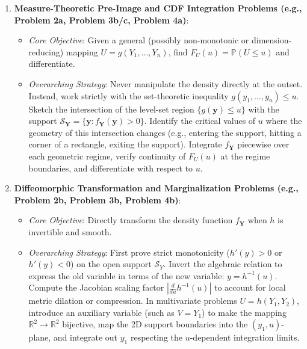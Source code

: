 \documentclass[11pt, letterpaper]{article}
\theoremstyle{definition}
\theoremstyle{remark}
\newcommand{\R}{\mathbb{R}}
\newcommand{\Prob}{\mathbb{P}}
\begin{document}
\begin{enumerate}[label=\textbf{\arabic*.}]
    \item \textbf{Measure-Theoretic Pre-Image and CDF Integration Problems (e.g., Problem 2a, Problem 3b/c, Problem 4a)}:
    \begin{itemize}
        \item \textit{Core Objective}: Given a general (possibly non-monotonic or dimension-reducing) mapping $U = g(Y_1, \dots, Y_n)$, find $F_U(u) = \Prob(U \le u)$ and differentiate.
        \item \textit{Overarching Strategy}: Never manipulate the density directly at the outset. Instead, work strictly with the set-theoretic inequality $g(y_1, \dots, y_n) \le u$. Sketch the intersection of the level-set region $\{g(\mathbf{y}) \le u\}$ with the support $\mathcal{S}_{\mathbf{Y}} = \{\mathbf{y} : f_{\mathbf{Y}}(\mathbf{y}) > 0\}$. Identify the critical values of $u$ where the geometry of this intersection changes (e.g., entering the support, hitting a corner of a rectangle, exiting the support). Integrate $f_{\mathbf{Y}}$ piecewise over each geometric regime, verify continuity of $F_U(u)$ at the regime boundaries, and differentiate with respect to $u$.
    \end{itemize}

    \item \textbf{Diffeomorphic Transformation and Marginalization Problems (e.g., Problem 2b, Problem 3b, Problem 4b)}:
    \begin{itemize}
        \item \textit{Core Objective}: Directly transform the density function $f_{\mathbf{Y}}$ when $h$ is invertible and smooth.
        \item \textit{Overarching Strategy}: First prove strict monotonicity ($h'(y) > 0$ or $h'(y) < 0$) on the open support $\mathcal{S}_Y$. Invert the algebraic relation to express the old variable in terms of the new variable: $y = h^{-1}(u)$. Compute the Jacobian scaling factor $\left|\frac{d}{du}h^{-1}(u)\right|$ to account for local metric dilation or compression. In multivariate problems $U = h(Y_1, Y_2)$, introduce an auxiliary variable (such as $V = Y_1$) to make the mapping $\R^2 \to \R^2$ bijective, map the 2D support boundaries into the $(y_1, u)$-plane, and integrate out $y_1$ respecting the $u$-dependent integration limits.
    \end{itemize}


\end{enumerate}
\end{document}
